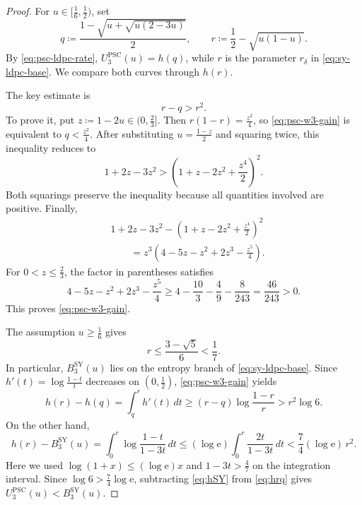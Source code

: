 \documentclass[11pt]{article}
\renewcommand{\leq}{\leqslant}
\renewcommand{\geq}{\geqslant}
\theoremstyle{remark}
\newcommand{\PSC}{\mathrm{PSC}}
\begin{document}
\begin{proof}
For $u \in [\frac{1}{6},\frac{1}{2})$, set
\begin{equation*}
q
\coloneqq
\frac{1-\sqrt{u+\sqrt{u(2-3u)}}}{2},
\qquad
r
\coloneqq
\frac{1}{2}-\sqrt{u(1-u)}.
\end{equation*}
By \eqref{eq:psc-ldpc-rate}, $U_3^{\PSC}(u) = h(q)$, while $r$ is the parameter $r_\delta$ in \eqref{eq:sy-ldpc-base}. We compare both curves through $h(r)$.

The key estimate is
\begin{equation}
\label{eq:psc-w3-gain}
r-q > r^2.
\end{equation}
To prove it, put $z \coloneqq 1-2u \in (0,\frac{2}{3}]$. Then $r(1-r) = \frac{z^2}{4}$, so \eqref{eq:psc-w3-gain} is equivalent to $q < \frac{z^2}{4}$. After substituting $u = \frac{1-z}{2}$ and squaring twice, this inequality reduces to
\begin{equation*}
1+2z-3z^2
>
\left(1+z-2z^2+\frac{z^4}{2}\right)^2.
\end{equation*}
Both squarings preserve the inequality because all quantities involved are positive. Finally,
\begin{align*}
&1+2z-3z^2
-\left(1+z-2z^2+\frac{z^4}{2}\right)^2\\
&\qquad
=z^3\left(4-5z-z^2+2z^3-\frac{z^5}{4}\right).
\end{align*}
For $0 < z \leq \frac{2}{3}$, the factor in parentheses satisfies
\begin{equation*}
4-5z-z^2+2z^3-\frac{z^5}{4}
\geq
4-\frac{10}{3}-\frac{4}{9}-\frac{8}{243}
= \frac{46}{243} > 0.
\end{equation*}
This proves \eqref{eq:psc-w3-gain}.

The assumption $u \geq \frac{1}{6}$ gives
\begin{equation*}
r
\leq
\frac{3-\sqrt{5}}{6}
< \frac{1}{7}.
\end{equation*}
In particular, $B_3^{\mathrm{SY}}(u)$ lies on the entropy branch of \eqref{eq:sy-ldpc-base}. Since $h'(t) = \log\frac{1-t}{t}$ decreases on $(0,\frac{1}{2})$, \eqref{eq:psc-w3-gain} yields
\begin{equation}
\label{eq:hrq}
h(r)-h(q)
=\int_q^r h'(t)\,dt
\geq(r-q)\log\frac{1-r}{r}
>r^2\log{6}.
\end{equation}
On the other hand,
\begin{equation}
\label{eq:hSY}
h(r)-B_3^{\mathrm{SY}}(u)
=\int_0^r\log\frac{1-t}{1-3t}\,dt
\leq(\log{\mathrm e})\int_0^r\frac{2t}{1-3t}\,dt
<\frac{7}{4}(\log{\mathrm e})\,r^2.
\end{equation}
Here we used $\log(1+x) \leq (\log{\mathrm e})x$ and $1-3t > \frac{4}{7}$ on the integration interval. Since $\log{6} > \frac{7}{4}\log{\mathrm e}$, subtracting \eqref{eq:hSY} from \eqref{eq:hrq} gives $U_3^{\PSC}(u) < B_3^{\mathrm{SY}}(u)$.
\end{proof}
\end{document}
